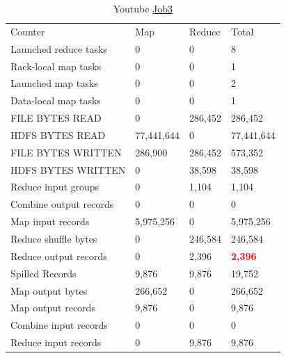 \documentclass[paper=a4, fontsize=11pt]{scrartcl}	%
\numberwithin{equation}{section}															%
\numberwithin{figure}{section}																%
\numberwithin{table}{section}																%
\begin{document}
\begin{table}[!h]
	\centering
	\caption{Youtube \href{http://hadoop-compute0.di.univr.it:50030/jobdetails.jsp?jobid=job_201603141010_12293}{Job3}}
	\label{my-label}
	\begin{tabular}{llll}
		Counter&	Map	&Reduce	&Total\\
		Launched reduce tasks	&0	&0	&8\\
		Rack-local map tasks	&0	&0	&1\\
		Launched map tasks	&0	&0	&2\\
		Data-local map tasks	&0	&0	&1\\
		FILE BYTES READ	&0	&286,452	&286,452\\
		HDFS BYTES READ	&77,441,644	&0	&77,441,644\\
		FILE BYTES WRITTEN	&286,900	&286,452	&573,352\\
		HDFS BYTES WRITTEN	&0	&38,598	&38,598\\
		Reduce input groups	&0	&1,104	&1,104\\
		Combine output records	&0	&0	&0\\
		Map input records	&5,975,256	&0	&5,975,256\\
		Reduce shuffle bytes	&0	&246,584	&246,584\\
		Reduce output records	&0	&2,396	&\textbf{\textcolor{red}{2,396}}\\
		Spilled Records	&9,876	&9,876	&19,752\\
		Map output bytes	&266,652	&0	&266,652\\
		Map output records	&9,876	&0	&9,876\\
		Combine input records	&0	&0	&0\\
		Reduce input records	&0	&9,876	&9,876\\
		
	\end{tabular}
\end{table}
\end{document}
